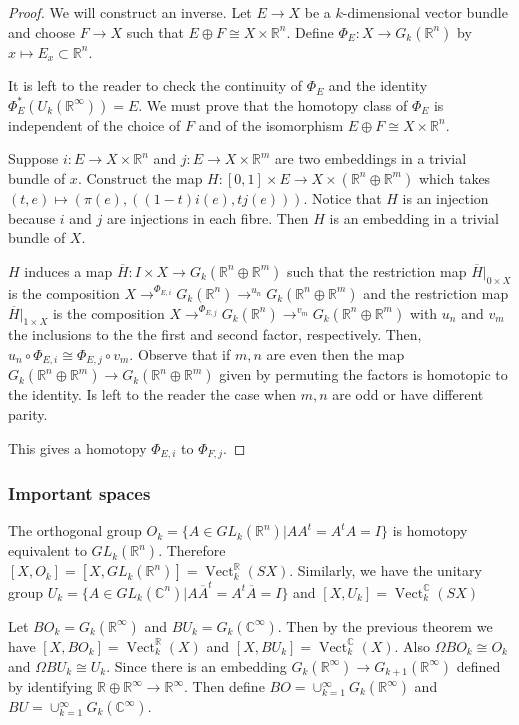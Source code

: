 \documentclass[a4paper,10pt]{article}
\theoremstyle{plain}%
\theoremstyle{definition}
\theoremstyle{remark}
\newcommand{\RR}{\mathbb{R}}
\newcommand{\CC}{\mathbb{C}}
\DeclareMathOperator{\Vect}{Vect}
\begin{document}
\begin{proof}
We will construct an inverse. Let $E\to X$ be a $k$-dimensional vector bundle and choose $F \to X$ such that $E\oplus F \cong X\times \RR^n.$
Define $\Phi_E: X\to G_k(\RR^ n)$ by $x\mapsto E_x\subset \RR^n.$

It is left to the reader to check the continuity of $\Phi_E$ and the identity $\Phi_E^*(U_k(\RR^\infty))= E.$ We must prove that the homotopy class of $\Phi_E$ is independent of the choice of $F$ and of the isomorphism $E\oplus F \cong X\times \RR^n.$

Suppose $i:E\to X\times\RR^n$ and $j:E\to X\times\RR^m$ are two embeddings in a trivial bundle of $x$. Construct the map
$H:[0,1]\times E\to X\times(\RR^n\oplus\RR^m)$ which takes $(t,e)\mapsto (\pi(e),((1-t)i(e),tj(e))).$ Notice that $H$ is an injection because $i$ and $j$ are injections in each fibre. Then $H$ is an embedding in a trivial bundle of $X$.

$H$ induces a map $\overline{H}: I\times X \to G_k(\RR^n\oplus\RR^m)$ such that
the restriction map $\overline{H}|_{{0}\times X}$ is the composition $X \to^{\Phi_{E,i}} G_k(\RR^n) \to^{u_n}  G_k(\RR^n\oplus\RR^m)$ and the restriction map $\overline{H}|_{{1}\times X}$ is the composition $X \to^{\Phi_{E,j}} G_k(\RR^n) \to^{v_m}  G_k(\RR^n\oplus\RR^m)$ with $u_n$ and $v_m$ the inclusions to the the first and second factor, respectively. Then, $u_n\circ \Phi_{E,i} \cong \Phi_{E,j} \circ v_m.$ Observe that if $m,n$ are even then the map $G_k(\RR^n\oplus\RR^m) \to G_k(\RR^n\oplus\RR^m)$ given by permuting the factors is homotopic to the identity. Is left to the reader the case when $m,n$ are odd or have different parity.

This gives a homotopy $\Phi_{E,i}$ to $\Phi_{F,j}.$
\end{proof}

\subsubsection{Important spaces}

The orthogonal group $O_k = \{ A\in GL_k(\RR^n) | AA^t = A^tA = I\}$ is homotopy equivalent to $GL_k(\RR^n).$ Therefore $[X,O_k]=[X,GL_k(\RR^n)] = \Vect_k^\RR(SX).$ Similarly, we have the unitary group $U_k = \{ A\in GL_k(\CC^n) | A\overline{A}^t = A^t\overline{A} = I\}$ and $[X,U_k]= \Vect_k^\CC(SX)$

Let $BO_k = G_k(\RR^\infty)$ and $BU_k = G_k(\CC^\infty)$. Then by the previous theorem we have $[X,BO_k]= \Vect_k^\RR(X)$ and $[X,BU_k]= \Vect_k^\CC(X)$.  Also $\Omega BO_k \cong O_k$ and $\Omega BU_k \cong U_k.$  Since there is an embedding $G_k(\RR^\infty)\to G_{k+1}(\RR^\infty)$ defined by identifying $\RR\oplus\RR^\infty\to \RR^\infty.$ Then define $BO = \cup_{k=1}^\infty G_k(\RR^\infty)$ and $BU = \cup_{k=1}^\infty G_k(\CC^\infty)$.
\end{document}
